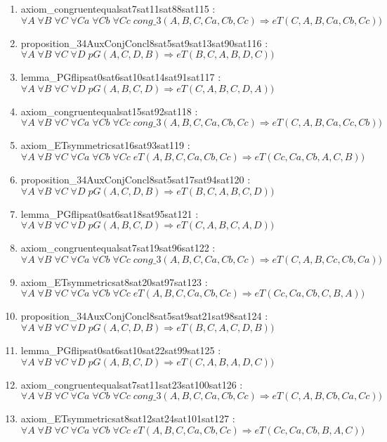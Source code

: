\documentclass{article}
\begin{document}
\begin{enumerate}
\item axiom\_congruentequalsat7sat11sat88sat115 : $\forall A\;\forall B\;\forall C\;\forall Ca\;\forall Cb\;\forall Cc\;cong\_3(A, B, C, Ca, Cb, Cc) \Rightarrow eT(C, A, B, Ca, Cb, Cc))$
\item proposition\_34AuxConjConcl8sat5sat9sat13sat90sat116 : $\forall A\;\forall B\;\forall C\;\forall D\;pG(A, C, D, B) \Rightarrow eT(B, C, A, B, D, C))$
\item lemma\_PGflipsat0sat6sat10sat14sat91sat117 : $\forall A\;\forall B\;\forall C\;\forall D\;pG(A, B, C, D) \Rightarrow eT(C, A, B, C, D, A))$
\item axiom\_congruentequalsat15sat92sat118 : $\forall A\;\forall B\;\forall C\;\forall Ca\;\forall Cb\;\forall Cc\;cong\_3(A, B, C, Ca, Cb, Cc) \Rightarrow eT(C, A, B, Ca, Cc, Cb))$
\item axiom\_ETsymmetricsat16sat93sat119 : $\forall A\;\forall B\;\forall C\;\forall Ca\;\forall Cb\;\forall Cc\;eT(A, B, C, Ca, Cb, Cc) \Rightarrow eT(Cc, Ca, Cb, A, C, B))$
\item proposition\_34AuxConjConcl8sat5sat17sat94sat120 : $\forall A\;\forall B\;\forall C\;\forall D\;pG(A, C, D, B) \Rightarrow eT(B, C, A, B, C, D))$
\item lemma\_PGflipsat0sat6sat18sat95sat121 : $\forall A\;\forall B\;\forall C\;\forall D\;pG(A, B, C, D) \Rightarrow eT(C, A, B, C, A, D))$
\item axiom\_congruentequalsat7sat19sat96sat122 : $\forall A\;\forall B\;\forall C\;\forall Ca\;\forall Cb\;\forall Cc\;cong\_3(A, B, C, Ca, Cb, Cc) \Rightarrow eT(C, A, B, Cc, Cb, Ca))$
\item axiom\_ETsymmetricsat8sat20sat97sat123 : $\forall A\;\forall B\;\forall C\;\forall Ca\;\forall Cb\;\forall Cc\;eT(A, B, C, Ca, Cb, Cc) \Rightarrow eT(Cc, Ca, Cb, C, B, A))$
\item proposition\_34AuxConjConcl8sat5sat9sat21sat98sat124 : $\forall A\;\forall B\;\forall C\;\forall D\;pG(A, C, D, B) \Rightarrow eT(B, C, A, C, D, B))$
\item lemma\_PGflipsat0sat6sat10sat22sat99sat125 : $\forall A\;\forall B\;\forall C\;\forall D\;pG(A, B, C, D) \Rightarrow eT(C, A, B, A, D, C))$
\item axiom\_congruentequalsat7sat11sat23sat100sat126 : $\forall A\;\forall B\;\forall C\;\forall Ca\;\forall Cb\;\forall Cc\;cong\_3(A, B, C, Ca, Cb, Cc) \Rightarrow eT(C, A, B, Cb, Ca, Cc))$
\item axiom\_ETsymmetricsat8sat12sat24sat101sat127 : $\forall A\;\forall B\;\forall C\;\forall Ca\;\forall Cb\;\forall Cc\;eT(A, B, C, Ca, Cb, Cc) \Rightarrow eT(Cc, Ca, Cb, B, A, C))$

\end{enumerate}
\end{document}
